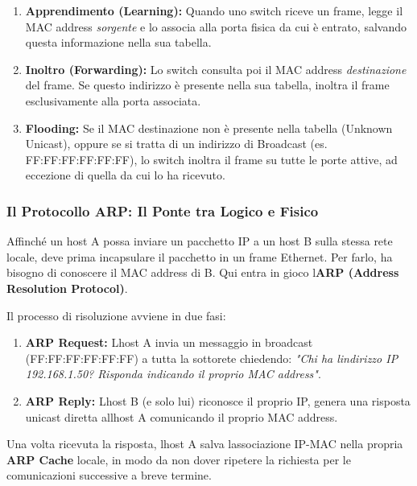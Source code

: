 \documentclass[11pt,a4paper]{article}
\begin{document}
\begin{enumerate}
\def\labelenumi{\arabic{enumi}.}
\item
  \textbf{Apprendimento (Learning):} Quando uno switch riceve un frame,
  legge il MAC address \emph{sorgente} e lo associa alla porta fisica da
  cui è entrato, salvando questa informazione nella sua tabella.
\item
  \textbf{Inoltro (Forwarding):} Lo switch consulta poi il MAC address
  \emph{destinazione} del frame. Se questo indirizzo è presente nella
  sua tabella, inoltra il frame esclusivamente alla porta associata.
\item
  \textbf{Flooding:} Se il MAC destinazione non è presente nella tabella
  (Unknown Unicast), oppure se si tratta di un indirizzo di Broadcast
  (es. FF:FF:FF:FF:FF:FF), lo switch inoltra il frame su tutte le porte
  attive, ad eccezione di quella da cui lo ha ricevuto.
\end{enumerate}

\subsubsection{Il Protocollo ARP: Il Ponte tra Logico e
Fisico}\label{il-protocollo-arp-il-ponte-tra-logico-e-fisico}

Affinché un host A possa inviare un pacchetto IP a un host B sulla
stessa rete locale, deve prima incapsulare il pacchetto in un frame
Ethernet. Per farlo, ha bisogno di conoscere il MAC address di B. Qui
entra in gioco l\textquotesingle{}\textbf{ARP (Address Resolution
Protocol)}.

Il processo di risoluzione avviene in due fasi:

\begin{enumerate}
\def\labelenumi{\arabic{enumi}.}
\item
  \textbf{ARP Request:} L\textquotesingle host A invia un messaggio in
  broadcast (FF:FF:FF:FF:FF:FF) a tutta la sottorete chiedendo:
  \emph{"Chi ha l\textquotesingle indirizzo IP 192.168.1.50? Risponda
  indicando il proprio MAC address"}.
\item
  \textbf{ARP Reply:} L\textquotesingle host B (e solo lui) riconosce il
  proprio IP, genera una risposta unicast diretta
  all\textquotesingle host A comunicando il proprio MAC address.
\end{enumerate}

Una volta ricevuta la risposta, l\textquotesingle host A salva
l\textquotesingle associazione IP-MAC nella propria \textbf{ARP Cache}
locale, in modo da non dover ripetere la richiesta per le comunicazioni
successive a breve termine.
\end{document}

